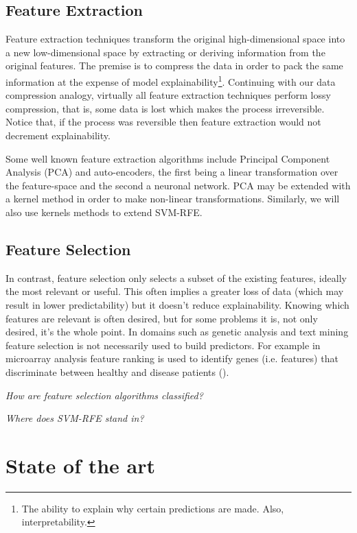 \subsection{Feature Extraction}

Feature extraction techniques transform the original high-dimensional space into a new low-dimensional space by extracting or deriving information from the original features. The premise is to compress the data in order to pack the same information at the expense of model explainability\footnote{The ability to explain why certain predictions are made. Also, interpretability.}. Continuing with our data compression analogy, virtually all feature extraction techniques perform lossy com\-pres\-sion, that is, some data is lost which makes the process irreversible. Notice that, if the process was reversible then feature extraction would not decrement explainability.

Some well known feature extraction algorithms include Principal Component Analysis (PCA) and auto-encoders, the first being a linear transformation over the feature-space and the second a neuronal network. PCA may be extended with a kernel method in order to make non-linear transformations. Similarly, we will also use kernels methods to extend SVM-RFE.

\subsection{Feature Selection}

In contrast, feature selection only selects a subset of the existing features, ideally the most relevant or useful. This often implies a greater loss of data (which may result in lower predictability) but it doesn't reduce explainability. Knowing which features are relevant is often desired, but for some problems it is, not only desired, it's the whole point. In domains such as genetic analysis and text mining feature selection is not necessarily used to build predictors. For example in microarray analysis feature ranking is used to identify genes (i.e. features) that discriminate between healthy and disease patients (\cite{guyon_introduction_2003}). 

\emph{How are feature selection algorithms classified?}

\emph{Where does SVM-RFE stand in?}


\section{State of the art}

